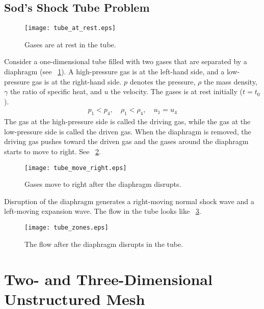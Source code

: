 \documentclass{turgon}
\begin{document}
\section{Sod's Shock Tube Problem}

\begin{figure}[h]
\centering
\texttt{[image: tube\_at\_rest.eps]}
\caption{Gases are at rest in the tube.}
\label{f:tube_at_rest}
\end{figure}

Consider a one-dimensional tube filled with two gases that are separated by a
diaphragm (see \figurename~\ref{f:tube_at_rest}).  A high-pressure gas is at
the left-hand side, and a low-pressure gas is at the right-hand side.  $p$
denotes the pressure, $\rho$ the mass density, $\gamma$ the ratio of specific
heat, and $u$ the velocity.  The gases is at rest initially ($t = t_0$).
\begin{align}
  p_1 < p_4 , \quad
  \rho_1 < \rho_4, \quad
  u_1 = u_4
\end{align}
The gas at the high-pressure side is called the driving gas, while the gas at
the low-pressure side is called the driven gas.  When the diaphragm is removed,
the driving gas pushes toward the driven gas and the gases around the diaphragm
starts to move to right.  See \figurename~\ref{f:tube_move_right}.

\begin{figure}[h]
\centering
\texttt{[image: tube\_move\_right.eps]}
\caption{Gases move to right after the diaphragm disrupts.}
\label{f:tube_move_right}
\end{figure}

Disruption of the diaphragm generates a right-moving normal shock wave and a
left-moving expansion wave.  The flow in the tube looks like
\figurename~\ref{f:tube_zones}.

\begin{figure}[h]
\centering
\texttt{[image: tube\_zones.eps]}
\caption{The flow after the diaphragm disrupts in the tube.}
\label{f:tube_zones}
\end{figure}


\chapter{Two- and Three-Dimensional Unstructured Mesh}
\label{c:ustm}

\clearpage
{}


\end{document}
